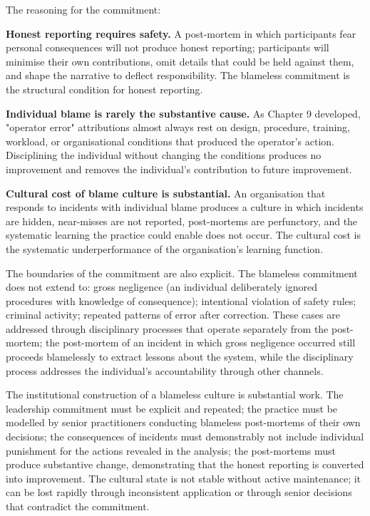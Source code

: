 The reasoning for the commitment:

\textbf{Honest reporting requires safety.} A post-mortem in which participants fear personal consequences will not produce honest reporting; participants will minimise their own contributions, omit details that could be held against them, and shape the narrative to deflect responsibility. The blameless commitment is the structural condition for honest reporting.

\textbf{Individual blame is rarely the substantive cause.} As Chapter 9 developed, "operator error" attributions almost always rest on design, procedure, training, workload, or organisational conditions that produced the operator's action. Disciplining the individual without changing the conditions produces no improvement and removes the individual's contribution to future improvement.

\textbf{Cultural cost of blame culture is substantial.} An organisation that responds to incidents with individual blame produces a culture in which incidents are hidden, near-misses are not reported, post-mortems are perfunctory, and the systematic learning the practice could enable does not occur. The cultural cost is the systematic underperformance of the organisation's learning function.

The boundaries of the commitment are also explicit. The blameless commitment does not extend to: gross negligence (an individual deliberately ignored procedures with knowledge of consequence); intentional violation of safety rules; criminal activity; repeated patterns of error after correction. These cases are addressed through disciplinary processes that operate separately from the post-mortem; the post-mortem of an incident in which gross negligence occurred still proceeds blamelessly to extract lessons about the system, while the disciplinary process addresses the individual's accountability through other channels.

The institutional construction of a blameless culture is substantial work. The leadership commitment must be explicit and repeated; the practice must be modelled by senior practitioners conducting blameless post-mortems of their own decisions; the consequences of incidents must demonstrably not include individual punishment for the actions revealed in the analysis; the post-mortems must produce substantive change, demonstrating that the honest reporting is converted into improvement. The cultural state is not stable without active maintenance; it can be lost rapidly through inconsistent application or through senior decisions that contradict the commitment.

